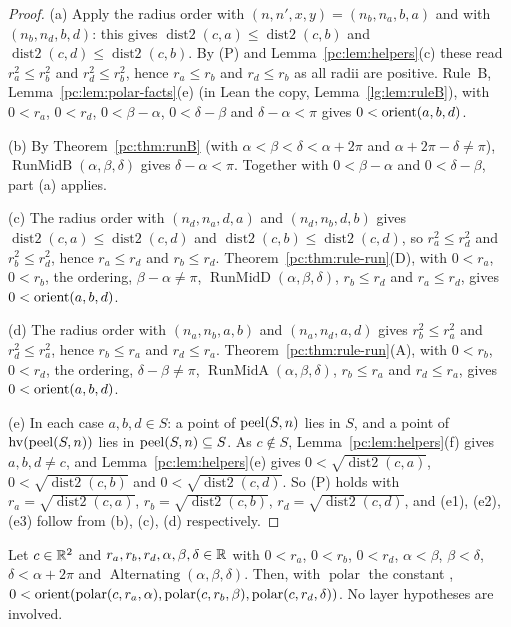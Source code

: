 \begin{proof}
(a) Apply the radius order with $(n,n',x,y)=(n_b,n_a,b,a)$ and with $(n_b,n_d,b,d)$: this gives
$\operatorname{dist2}(c,a)\le\operatorname{dist2}(c,b)$ and $\operatorname{dist2}(c,d)\le\operatorname{dist2}(c,b)$. By
(P) and Lemma~\ref{pc:lem:helpers}(c) these read $r_a^2\le r_b^2$ and $r_d^2\le r_b^2$, hence $r_a\le r_b$ and
$r_d\le r_b$ as all radii are positive. Rule~B, Lemma~\ref{pc:lem:polar-facts}(e) (in Lean the 
copy, Lemma~\ref{lg:lem:ruleB}), with $0<r_a$, $0<r_d$, $0<\beta-\alpha$, $0<\delta-\beta$ and $\delta-\alpha<\pi$
gives $0<\operatorname{orient}(a,b,d)$.

(b) By Theorem~\ref{pc:thm:runB} (with $\alpha<\beta<\delta<\alpha+2\pi$ and $\alpha+2\pi-\delta\neq\pi$),
$\operatorname{RunMidB}(\alpha,\beta,\delta)$ gives $\delta-\alpha<\pi$. Together with $0<\beta-\alpha$ and
$0<\delta-\beta$, part (a) applies.

(c) The radius order with $(n_d,n_a,d,a)$ and $(n_d,n_b,d,b)$ gives $\operatorname{dist2}(c,a)\le\operatorname{dist2}(c,d)$
and $\operatorname{dist2}(c,b)\le\operatorname{dist2}(c,d)$, so $r_a^2\le r_d^2$ and $r_b^2\le r_d^2$, hence
$r_a\le r_d$ and $r_b\le r_d$. Theorem~\ref{pc:thm:rule-run}(D), with $0<r_a$, $0<r_b$, the ordering,
$\beta-\alpha\neq\pi$, $\operatorname{RunMidD}(\alpha,\beta,\delta)$, $r_b\le r_d$ and $r_a\le r_d$, gives
$0<\operatorname{orient}(a,b,d)$.

(d) The radius order with $(n_a,n_b,a,b)$ and $(n_a,n_d,a,d)$ gives $r_b^2\le r_a^2$ and $r_d^2\le r_a^2$, hence
$r_b\le r_a$ and $r_d\le r_a$. Theorem~\ref{pc:thm:rule-run}(A), with $0<r_b$, $0<r_d$, the ordering,
$\delta-\beta\neq\pi$, $\operatorname{RunMidA}(\alpha,\beta,\delta)$, $r_b\le r_a$ and $r_d\le r_a$, gives
$0<\operatorname{orient}(a,b,d)$.

(e) In each case $a,b,d\in S$: a point of $\operatorname{peel}(S,n)$ lies in $S$, and a point of $\operatorname{hv}(\operatorname{peel}(S,n))$ lies in
$\operatorname{peel}(S,n)\subseteq S$. As $c\notin S$, Lemma~\ref{pc:lem:helpers}(f) gives $a,b,d\neq c$, and
Lemma~\ref{pc:lem:helpers}(e) gives $0<\sqrt{\operatorname{dist2}(c,a)}$, $0<\sqrt{\operatorname{dist2}(c,b)}$ and
$0<\sqrt{\operatorname{dist2}(c,d)}$. So (P) holds with $r_a=\sqrt{\operatorname{dist2}(c,a)}$,
$r_b=\sqrt{\operatorname{dist2}(c,b)}$, $r_d=\sqrt{\operatorname{dist2}(c,d)}$, and (e1), (e2), (e3) follow from (b),
(c), (d) respectively.
\end{proof}

\begin{corollary}\label{pc:cor:alt-polar}
Let $c\in\mathbb R^2$ and $r_a,r_b,r_d,\alpha,\beta,\delta\in\mathbb R$ with $0<r_a$, $0<r_b$, $0<r_d$, $\alpha<\beta$,
$\beta<\delta$, $\delta<\alpha+2\pi$ and $\operatorname{Alternating}(\alpha,\beta,\delta)$. Then, with
$\operatorname{polar}$ the constant ,
$0<\operatorname{orient}(\operatorname{polar}(c,r_a,\alpha),\operatorname{polar}(c,r_b,\beta),\operatorname{polar}(c,r_d,\delta))$.
No layer hypotheses are involved.
\end{corollary}

